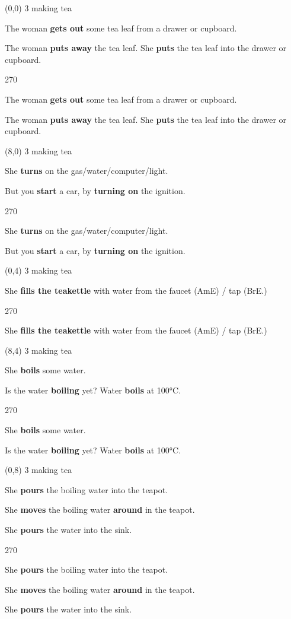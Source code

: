 \documentclass[a4paper]{article}
\newenvironment{itemize*}%
{\begin{itemize}%
 \setlength{\itemsep}{0.0cm}%
 \setlength{\parsep}{0pt}%
 \setlength{\parskip}{0pt}}%
{\end{itemize}}
\newcommand{\mycard}[3]{%
	\small #1 #2
	\par
	\parbox[t][6.8cm][c]{9.5cm}{%
	\par
	\myleft{#3}
	\par
	\myright{#3}
	}
}
\newcommand{\myleft}[1]{%
	\begin{sideways}
	\hspace*{-0.9cm}
		\parbox[t][2.7cm][t]{6.5cm}{%
		\Large #1
		}
	\end{sideways}
}
\newcommand{\myright}[1]{%
	\hspace*{6.5cm}
	\begin{turn}{270}
	\hspace*{-7.1cm}
		\parbox[t][2.7cm][t]{6.5cm}{%
		\Large #1
		}
	\end{turn}
}
\begin{document}
\begin{textblock}{8}(0,0)
\mycard{3}{making tea}{
\begin{itemize*}
\item The woman \textbf{gets out} some tea leaf from a drawer or cupboard.
\item The woman \textbf{puts away} the tea leaf. She \textbf{puts} the tea leaf into the drawer or cupboard.
\end{itemize*}
}
\end{textblock}

\begin{textblock}{8}(8,0)
\mycard{3}{making tea}{
\begin{itemize*}
\item She \textbf{turns} on the gas/water/computer/light. 
\item But you \textbf{start} a car, by \textbf{turning on} the ignition.
\end{itemize*}
}
\end{textblock}

\begin{textblock}{8}(0,4)
\mycard{3}{making tea}{
\begin{itemize*}
\item She \textbf{fills the teakettle} with water from the faucet (AmE) / tap (BrE.)
\end{itemize*}
}
\end{textblock}

\begin{textblock}{8}(8,4)
\mycard{3}{making tea}{
\begin{itemize*}
\item She \textbf{boils} some water.
\item Is the water \textbf{boiling} yet? Water \textbf{boils} at 100°C.
\end{itemize*}
}
\end{textblock}

\begin{textblock}{8}(0,8)
\mycard{3}{making tea}{
\begin{itemize*}
\item She \textbf{pours} the boiling water into the teapot.
\item She \textbf{moves} the boiling water \textbf{around} in the teapot.
\item She \textbf{pours} the water into the sink.
\end{itemize*}
}
\end{textblock}
\end{document}
